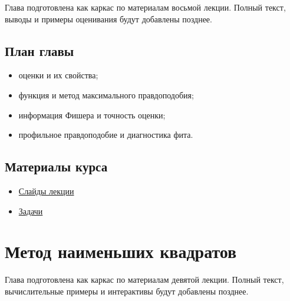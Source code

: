 \documentclass[
  russian,
  12pt,
  a4paper,
  a4paper,
  openany]{scrbook}
\providecommand{\tightlist}{%
  \setlength{\itemsep}{0pt}\setlength{\parskip}{0pt}}
\begin{document}
\begin{bookchapteropening}

Глава подготовлена как каркас по материалам восьмой лекции. Полный
текст, выводы и примеры оценивания будут добавлены позднее.

\end{bookchapteropening}

\section{План
главы}\label{ux43fux43bux430ux43d-ux433ux43bux430ux432ux44b-6}

\begin{itemize}
\tightlist
\item
  оценки и их свойства;
\item
  функция и метод максимального правдоподобия;
\item
  информация Фишера и точность оценки;
\item
  профильное правдоподобие и диагностика фита.
\end{itemize}

\section{Материалы
курса}\label{ux43cux430ux442ux435ux440ux438ux430ux43bux44b-ux43aux443ux440ux441ux430-5}

\begin{itemize}
\tightlist
\item
  \href{https://neutrinohit.github.io/statistical-analysis-course/ru/slides/07_parameter_estimation_and_maximum_likelihood.html}{Слайды
  лекции}
\item
  \href{https://neutrinohit.github.io/statistical-analysis-course/ru/slides/exercises/07_parameter_estimation_and_maximum_likelihood_exercises.html}{Задачи}
\end{itemize}

\chapter{Метод наименьших
квадратов}\label{ux43cux435ux442ux43eux434-ux43dux430ux438ux43cux435ux43dux44cux448ux438ux445-ux43aux432ux430ux434ux440ux430ux442ux43eux432}

\begin{bookchapteropening}

Глава подготовлена как каркас по материалам девятой лекции. Полный
текст, вычислительные примеры и интерактивы будут добавлены позднее.

\end{bookchapteropening}
\end{document}
